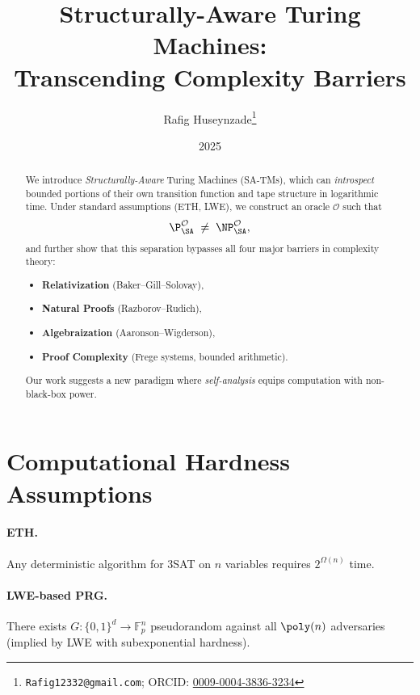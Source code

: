\documentclass[12pt]{article}
\newcommand{\F}{\mathbb{F}}
\begin{document}
\title{Structurally-Aware Turing Machines:\\Transcending Complexity Barriers}
\author{Rafig Huseynzade\thanks{\texttt{Rafig12332@gmail.com}; ORCID: \href{https://orcid.org/0009-0004-3836-3234}{0009-0004-3836-3234}}}
\date{2025}
\maketitle

\begin{abstract}
We introduce \emph{Structurally-Aware} Turing Machines (SA-TMs), which can \emph{introspect} bounded portions of their own transition function and tape structure in logarithmic time.  Under standard assumptions (ETH, LWE), we construct an oracle $\mathcal{O}$ such that
\[
\P^{\mathcal{O}}_{\SA} \;\neq\;\NP^{\mathcal{O}}_{\SA},
\]
and further show that this separation bypasses all four major barriers in complexity theory:
\begin{itemize}
  \item \textbf{Relativization} (Baker–Gill–Solovay),
  \item \textbf{Natural Proofs} (Razborov–Rudich),
  \item \textbf{Algebraization} (Aaronson–Wigderson),
  \item \textbf{Proof Complexity} (Frege systems, bounded arithmetic).
\end{itemize}
Our work suggests a new paradigm where \emph{self-analysis} equips computation with non-black-box power.
\end{abstract}

\section{Computational Hardness Assumptions}
\paragraph{ETH.} Any deterministic algorithm for 3SAT on $n$ variables requires $2^{\Omega(n)}$ time.  
\paragraph{LWE-based PRG.} There exists $G:\{0,1\}^d\to\F_p^n$ pseudorandom against all $\poly(n)$ adversaries (implied by LWE with subexponential hardness).
\end{document}
